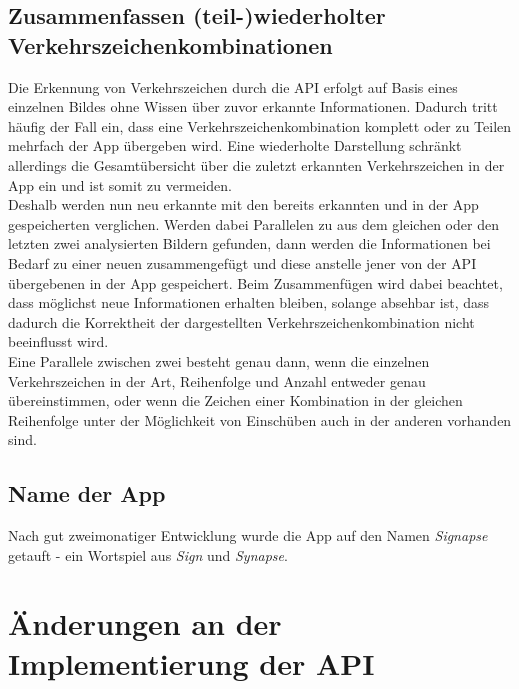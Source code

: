 \documentclass[12pt,a4paper,ngerman,enabledeprecatedfontcommands]{scrreprt}
\begin{document}
\subsection{Zusammenfassen (teil-)wiederholter Verkehrszeichenkombinationen}
Die Erkennung von Verkehrszeichen durch die \gls{API} erfolgt auf Basis eines einzelnen Bildes ohne Wissen über zuvor erkannte Informationen. Dadurch tritt häufig der Fall ein, dass eine \gls{Verkehrszeichenkombination} komplett oder zu Teilen mehrfach der App übergeben wird. Eine wiederholte Darstellung schränkt allerdings die Gesamtübersicht über die zuletzt erkannten Verkehrszeichen in der \gls{App} ein und ist somit zu vermeiden.\\
Deshalb werden nun neu erkannte  mit den bereits erkannten und in der \gls{App} gespeicherten verglichen. Werden dabei Parallelen zu  aus dem gleichen oder den letzten zwei analysierten Bildern gefunden, dann werden die Informationen bei Bedarf zu einer neuen  zusammengefügt und diese anstelle jener von der \gls{API} übergebenen in der \gls{App} gespeichert. Beim Zusammenfügen wird dabei beachtet, dass möglichst neue Informationen erhalten bleiben, solange absehbar ist, dass dadurch die Korrektheit der dargestellten \gls{Verkehrszeichenkombination} nicht beeinflusst wird.\\
Eine Parallele zwischen zwei  besteht genau dann, wenn die einzelnen Verkehrszeichen in der Art, Reihenfolge und Anzahl entweder genau übereinstimmen, oder wenn die Zeichen einer Kombination in der gleichen Reihenfolge unter der Möglichkeit von  Einschüben auch in der anderen vorhanden sind.\\

\subsection{Name der App}
Nach gut zweimonatiger Entwicklung wurde die \gls{App} auf den Namen \textit{Signapse} getauft - ein Wortspiel aus \textit{Sign} und \textit{Synapse}.\\

\section{Änderungen an der Implementierung der API}
\end{document}
